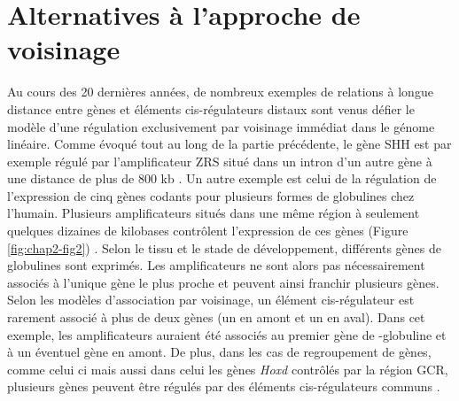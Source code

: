 \section{Alternatives à l'approche de voisinage}
\label{sec:correl-act}

Au cours des 20 dernières années, de nombreux exemples de relations à longue distance entre gènes et éléments \gls{cis}-régulateurs distaux sont venus défier le modèle d’une régulation exclusivement par voisinage immédiat dans le génome linéaire. Comme évoqué tout au long de la partie précédente, le gène \gls{SHH} est par exemple régulé par l’\gls{amplificateur} \acrshort{ZRS} situé dans un intron d’un autre gène à une distance de plus de 800 kb \citep{lettice_long-range_2003}. Un autre exemple est celui de la régulation de l’expression de cinq gènes codants pour plusieurs formes de globulines chez l’humain. Plusieurs \glspl{amplificateur} situés dans une même région à seulement quelques dizaines de kilobases contrôlent l’expression de ces gènes (Figure \ref{fig:chap2-fig2}) \citep{levings_human_2002}. Selon le tissu et le stade de développement, différents gènes de globulines sont exprimés. Les \glspl{amplificateur} ne sont alors pas nécessairement associés à l’unique gène le plus proche et peuvent ainsi franchir plusieurs gènes. Selon les modèles d’association par voisinage, un élément \gls{cis}-régulateur est rarement associé à plus de deux gènes (un en amont et un en aval). Dans cet exemple, les \glspl{amplificateur} auraient été associés au premier gène de \textepsilon-globuline et à un éventuel gène en amont. De plus, dans les cas de regroupement de gènes, comme celui ci mais aussi dans celui les gènes \textit{Hoxd} contrôlés par la région GCR, plusieurs gènes peuvent être régulés par des éléments \gls{cis}-régulateurs communs \citep{spitz_global_2003}. 

